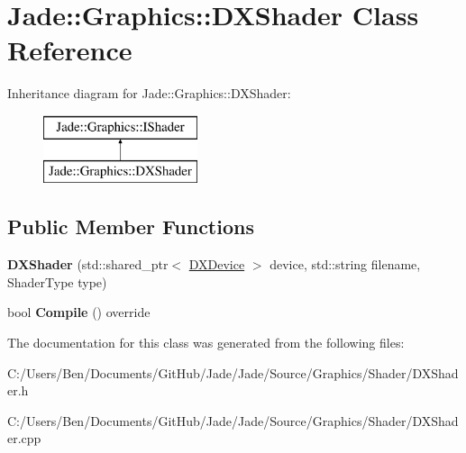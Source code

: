 \hypertarget{class_jade_1_1_graphics_1_1_d_x_shader}{}\section{Jade\+:\+:Graphics\+:\+:D\+X\+Shader Class Reference}
\label{class_jade_1_1_graphics_1_1_d_x_shader}
Inheritance diagram for Jade\+:\+:Graphics\+:\+:D\+X\+Shader\+:\begin{figure}[H]
\begin{center}
\leavevmode
\includegraphics[height=2.000000cm]{class_jade_1_1_graphics_1_1_d_x_shader}
\end{center}
\end{figure}
\subsection*{Public Member Functions}
\begin{DoxyCompactItemize}
\item 
\hypertarget{class_jade_1_1_graphics_1_1_d_x_shader_a6e46891491201994d504224a95f4e693}{}{\bfseries D\+X\+Shader} (std\+::shared\+\_\+ptr$<$ \hyperlink{class_jade_1_1_graphics_1_1_d_x_device}{D\+X\+Device} $>$ device, std\+::string filename, Shader\+Type type)\label{class_jade_1_1_graphics_1_1_d_x_shader_a6e46891491201994d504224a95f4e693}

\item 
\hypertarget{class_jade_1_1_graphics_1_1_d_x_shader_a928a7c40a5844ece8557147f480ab0bc}{}bool {\bfseries Compile} () override\label{class_jade_1_1_graphics_1_1_d_x_shader_a928a7c40a5844ece8557147f480ab0bc}

\end{DoxyCompactItemize}


The documentation for this class was generated from the following files\+:\begin{DoxyCompactItemize}
\item 
C\+:/\+Users/\+Ben/\+Documents/\+Git\+Hub/\+Jade/\+Jade/\+Source/\+Graphics/\+Shader/D\+X\+Shader.\+h\item 
C\+:/\+Users/\+Ben/\+Documents/\+Git\+Hub/\+Jade/\+Jade/\+Source/\+Graphics/\+Shader/D\+X\+Shader.\+cpp\end{DoxyCompactItemize}
